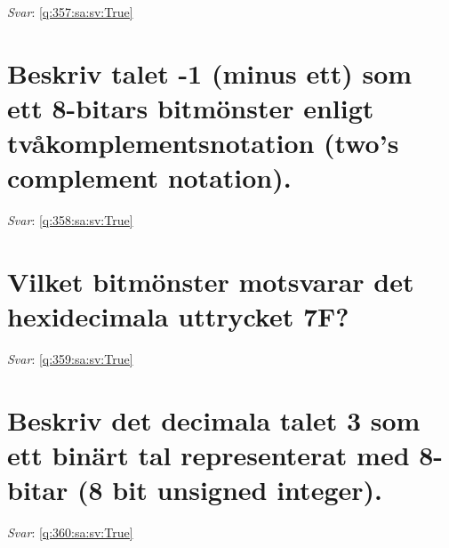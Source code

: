 \documentclass[a4paper,11pt,oneside]{book}
\begin{document}
\begin{sloppypar}
\noindent\makebox[\textwidth]{\hrulefill}

\vspace{1cm}

\textit{Svar}: \autoref{q:357:sa:sv:True}



\section{Beskriv talet -1 (minus ett) som ett 8-bitars bitm\"onster enligt tv\r{a}komplementsnotation (two{\textquoteright}s complement notation).}

\label{q:358:sa:sv:False}

\vspace{2cm}

\noindent\makebox[\textwidth]{\hrulefill}

\vspace{1cm}

\textit{Svar}: \autoref{q:358:sa:sv:True}



\section{Vilket bitm\"onster motsvarar det hexidecimala uttrycket 7F?}

\label{q:359:sa:sv:False}

\vspace{2cm}

\noindent\makebox[\textwidth]{\hrulefill}

\vspace{1cm}

\textit{Svar}: \autoref{q:359:sa:sv:True}



\section{Beskriv det decimala talet 3 som ett bin\"art tal representerat med 8-bitar (8 bit unsigned integer).}

\label{q:360:sa:sv:False}

\vspace{2cm}

\noindent\makebox[\textwidth]{\hrulefill}

\vspace{1cm}

\textit{Svar}: \autoref{q:360:sa:sv:True}




\end{sloppypar}
\end{document}
